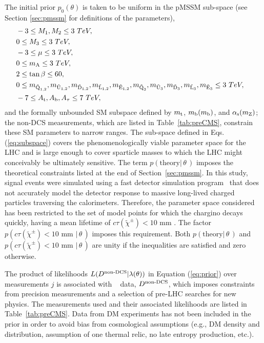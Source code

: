The initial prior $p_0(\theta)$ is taken to be uniform in the pMSSM sub-space (see Section \ref{sec:pmssm} for definitions of the parameters),
\begin{eqnarray}
	&-3 \le M_1, M_2 \le 3 ~ TeV,& \nonumber\\
	&0 \le M_3 \le 3 ~ TeV,			& \nonumber\\
	&-3 \le \mu \le 3 ~ TeV,		& \nonumber\\
	&0 \le m_{\rm A} \le 3 ~ TeV,			& \nonumber\\
	&2 \le \tan\beta \le 60,		& \nonumber\\
	&0 \le m_{{\tilde{\text{Q}}_{1,2}}}, m_{{\tilde{\text{U}}_{1,2}}}, m_{{\tilde{\text{D}}_{1,2}}}, m_{{\tilde{\text{L}}_{1,2}}}, m_{{\tilde{\text{E}}_{1,2}}}, m_{{\tilde{\text{Q}}_3}}, m_{{\tilde{\text{U}}_3}}, m_{{\tilde{\text{D}}_3}},m_{{\tilde{\text{L}}_3}}, m_{{\tilde{\text{E}}_3}} \le 3 ~ TeV,	& \nonumber\\
	&-7 \le A_{\text{t}}, A_{\text{b}}, A_\tau \le 7 ~ TeV,
\label{eq:subspace}
\end{eqnarray}
and the formally unbounded 
SM subspace defined by $m_{\rm t}$, $m_{\rm b}(m_{\rm
  b})$, and $\alpha_{\rm s}(m_{\rm Z})$; the non-DCS measurements, which are listed in Table~\ref{tab:preCMS}, constrain these SM parameters to narrow ranges.   
The sub-space defined in Eqs. (\ref{eq:subspace}) 
covers the 
phenomenologically viable parameter space for the LHC and 
is large enough to cover sparticle masses to which the LHC might
conceivably be 
ultimately sensitive.  
The term $p(\textrm{theory} |\,\theta\,)$  imposes the theoretical constraints listed at the end of Section~\ref{sec:pmssm}. In this study, signal events were simulated using a fast detector simulation program~\cite{fastsim} that does not accurately model the detector response to massive long-lived charged particles traversing the calorimeters. Therefore, the parameter space considered has been restricted to the set of model points for which the chargino decays quickly, having a mean lifetime of $c\tau(\tilde{\chi}^\pm)<10\text{ mm }$.  The factor $p(c\tau(\tilde{\chi}^\pm)<10\text{ mm } |\, \theta\,)$ imposes this requirement. Both  $p(\textrm{theory} |\, \theta\,)$ 
and $p(c\tau(\tilde{\chi}^\pm)<10\text{ mm } |\,\theta\,)$ are unity if the
inequalities are satisfied and zero otherwise. 


The product of likelihoods $L(D^{\text{non-DCS}}|\lambda(\theta))$ in
Equation (\ref{eq:prior}) over measurements $j$ is associated with \preCMS~ data, $D^{\text{non-DCS}}$,
which imposes constraints from precision measurements and a selection
of pre-LHC searches for new physics. The measurements used and their associated likelihoods are listed in Table~\ref{tab:preCMS}.
Data from DM experiments has not been included in the prior in order to avoid bias from cosmological assumptions (e.g., DM density and distribution, assumption of one thermal relic, no late entropy production, etc.).

